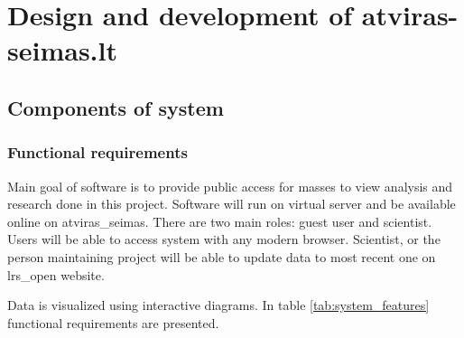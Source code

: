 \documentclass[a4paper,12pt]{article}
\begin{document}
 	
 	\clearpage
 	

    
    \clearpage
    
    \section{Design and development of atviras-seimas.lt}
    \subsection{Components of system}
   	\subsubsection{Functional requirements}
   	
   	Main goal of software is to provide public access for masses to view analysis and research done in this project. Software will run on virtual server and be available online on \gls{atviras_seimas}. There are two main roles: guest user and scientist. Users will be able to access system with any modern browser. Scientist, or the person maintaining project will be able to update data to most recent one on \gls{lrs_open} website.
   
   	
   	 Data is visualized using interactive diagrams. In table \ref{tab:system_features} functional requirements are presented.
   	
\end{document}
